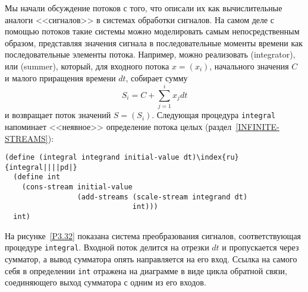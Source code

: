 Мы начали обсуждение потоков с того, что описали их как
вычислительные аналоги <<сигналов>> в системах обработки сигналов.
На самом деле с помощью потоков такие системы можно моделировать
самым непосредственным образом, представляя значения сигнала в
последовательные моменты времени как последовательные элементы
потока.  Например, можно реализовать
 (integrator), или
 (summer), который, для входного потока
$x = (x_i)$, начального значения $C$ и малого
приращения времени $dt$, собирает сумму
$$
S_i = C + \sum_{j=1}^i x_j dt
$$
и возвращает поток значений $S = (S_i)$. Следующая
процедура {\tt integral} напоминает <<неявное>> определение
потока целых (раздел~\ref{INFINITE-STREAMS}):

\begin{Verbatim}[fontsize=\small]
(define (integral integrand initial-value dt)\index{ru}{integral||||pd|}
  (define int
    (cons-stream initial-value
                 (add-streams (scale-stream integrand dt)
                              int)))
  int)
\end{Verbatim}
На рисунке~\ref{P3.32} показана система преобразования
сигналов, соответствующая процедуре {\tt integral}.  Входной
поток делится на отрезки $dt$ и пропускается через
сумматор, а вывод сумматора опять направляется на его вход.  Ссылка на
самого себя в определении {\tt int} отражена на диаграмме в
виде цикла обратной связи, соединяющего выход сумматора с одним из его
входов.


